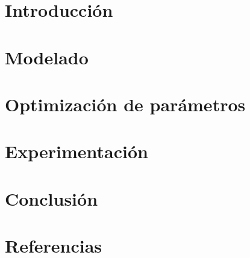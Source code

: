 \documentclass[a4paper]{article}
\begin{document}
\maketitle

\tableofcontents
\newpage

\section{Introducción}


\section{Modelado}


\section{Optimización de parámetros}




\section{Experimentación}


\section{Conclusión}


\section{Referencias}

\end{document}
